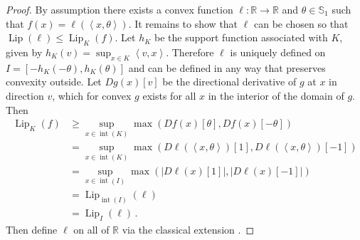 \documentclass[letter, 12pt]{report}
\newcommand{\R}{\mathbb R}
\newcommand{\ip}[1]{\left \langle #1 \right \rangle}
\newcommand{\sphere}{\mathbb{S}}
\newcommand{\lip}{\operatorname{Lip}}
\newcommand{\interior}{\operatorname{int}}
\newcommand{\1}{\mathbf{1}}
\theoremstyle{plain}
\theoremstyle{definition}
\theoremstyle{remark}
\begin{document}
\begin{proof}
    By assumption there exists a convex function $\ell : \R \to \R$ and $\theta \in \sphere_1$ such that $f(x) = \ell(\ip{x, \theta})$.
    It remains to show that $\ell$ can be chosen so that $\lip(\ell) \leq \lip_K(f)$.
    Let $h_K$ be the support function associated with $K$, given by $h_K(v) = \sup_{x \in K} \ip{v, x}$.
    Therefore $\ell$ is uniquely defined on $I = [-h_K(-\theta), h_K(\theta)]$ and can be defined in any way that preserves convexity outside.
    Let $Dg(x)[v]$ be the directional derivative of $g$ at $x$ in direction $v$, which for convex $g$ exists for all $x$ in the interior of the domain of $g$.
    Then
    \begin{align*}
        \lip_K(f)
         & \geq \sup_{x \in \interior(K)} \max(Df(x)[\theta], Df(x)[-\theta])                  \\
         & = \sup_{x \in \interior(K)} \max(D\ell(\ip{x,\theta})[1], D\ell(\ip{x,\theta})[-1]) \\
         & = \sup_{x \in \interior(I)} \max(|D\ell(x)[1]|, |D\ell(x)[-1]|)                     \\
         & = \lip_{\interior(I)}(\ell)                                                         \\
         & = \lip_I(\ell) \,.
    \end{align*}
    Then define $\ell$ on all of $\R$ via the classical extension \citep[Proposition 3.18, for example]{lat24book}.
\end{proof}
\end{document}

